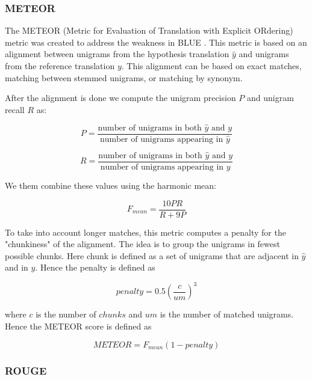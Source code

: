 \subsubsection{METEOR}



The METEOR (Metric for Evaluation of Translation with Explicit ORdering) metric was created to address the weakness in BLUE \cite{Lavie}. This metric is based on an alignment between unigrams from the hypothesis translation $\hat{y}$ and unigrams from the reference translation $y$. This alignment can be based on exact matches, matching between stemmed unigrams, or matching by synonym.

After the alignment is done we compute the unigram precision $P$ and unigram recall $R$ as:

\begin{equation}
P = \frac{\text{number of } \text{unigrams in both } \hat{y} \text{ and } y}{\text{number of } \text{unigrams appearing in } \hat{y}}
\end{equation}    


\begin{equation}
R = \frac{\text{number of } \text{unigrams in both } \hat{y} \text{ and } y}{\text{number of } \text{unigrams appearing in } y}
\end{equation}    

We them combine these values using the harmonic mean:

\begin{equation}
F_{mean} = \frac{10 P R}{R + 9P}
\end{equation}

To take into account longer matches, this metric computes a penalty for the "chunkiness" of the alignment. The idea is to group the unigrams in fewest possible chunks. Here chunk is defined as a set of unigrams that are adjacent in $\hat{y}$ and in $y$. Hence the penalty is defined as

\begin{equation}
penalty = 0.5 \left( \frac{c}{um} \right)^{3}
\end{equation}

where $c$ is the number of $chunks$ and $um$ is the number of matched unigrams. Hence the METEOR score is defined as

\begin{equation}
METEOR = F_{mean} (1 - penalty)
\end{equation}

\subsubsection{ROUGE}

